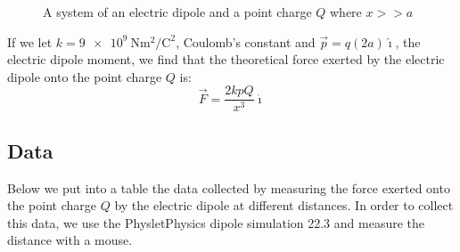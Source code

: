 \documentclass[12pt]{article}
\newcommand*{\I}{\imath}
\begin{document}
\begin{figure}[H]
    \centering

    \caption[10pt]{A system of an electric dipole and a point charge $Q$ where $x>>a$}

\end{figure}

If we let $k = \SI{9e+9}{\newton\metre\squared\per\coulomb\squared}$, Coulomb's constant and $\vec{p} = q(2a)\hat{\I}$, the electric dipole moment, we find that the theoretical force exerted by the electric dipole onto the point charge $Q$ is:
\begin{equation} \label{eq1}
    \vec{F} = \frac{2k p Q}{x^3} \hat{\I}
\end{equation}


\subsection{Data}
Below we put into a table the data collected by measuring the force exerted onto the point charge $Q$ by the electric dipole at different distances. In order to collect this data, we use the Physlet\textregistered \space Physics dipole simulation 22.3 and measure the distance with a mouse.

\setlength{\tabcolsep}{2pt}
\renewcommand{\arraystretch}{0.9}
\end{document}

